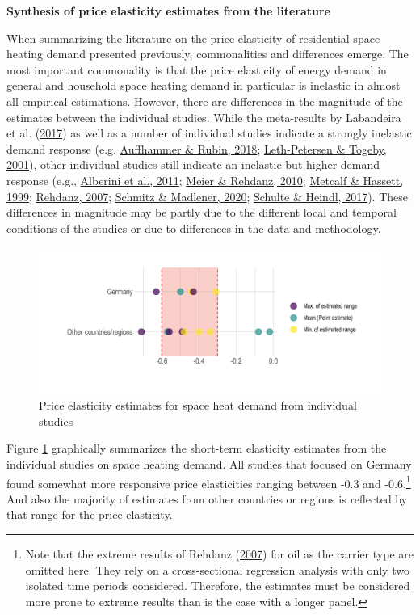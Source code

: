 \documentclass[12pt,twoside]{reedthesis}
\begin{document}
\textbf{Synthesis of price elasticity estimates from the literature}

When summarizing the literature on the price elasticity of residential space heating demand presented previously, commonalities and differences emerge. The most important commonality is that the price elasticity of energy demand in general and household space heating demand in particular is inelastic in almost all empirical estimations. However, there are differences in the magnitude of the estimates between the individual studies. While the meta-results by Labandeira et al. (\protect\hyperlink{ref-labandeira_etal17}{2017}) as well as a number of individual studies indicate a strongly inelastic demand response (e.g. \protect\hyperlink{ref-auffhammer_rubin18}{Auffhammer \& Rubin, 2018}; \protect\hyperlink{ref-leth-petersen_togeby01}{Leth-Petersen \& Togeby, 2001}), other individual studies still indicate an inelastic but higher demand response (e.g., \protect\hyperlink{ref-alberini_etal11}{Alberini et al., 2011}; \protect\hyperlink{ref-meier_rehdanz10}{Meier \& Rehdanz, 2010}; \protect\hyperlink{ref-metcalf_hassett99}{Metcalf \& Hassett, 1999}; \protect\hyperlink{ref-rehdanz07}{Rehdanz, 2007}; \protect\hyperlink{ref-schmitz_madlener20}{Schmitz \& Madlener, 2020}; \protect\hyperlink{ref-schulte_heindl17}{Schulte \& Heindl, 2017}). These differences in magnitude may be partly due to the different local and temporal conditions of the studies or due to differences in the data and methodology.
\begin{figure}

{\centering \includegraphics[width=1\linewidth]{figure/plot_literature_estimates} 

}

\caption{Price elasticity estimates for space heat demand from individual studies}\label{fig:literature-estimates-plot}
\end{figure}
Figure \ref{fig:literature-estimates-plot} graphically summarizes the short-term elasticity estimates from the individual studies on space heating demand. All studies that focused on Germany found somewhat more responsive price elasticities ranging between -0.3 and -0.6.\footnote{Note that the extreme results of Rehdanz (\protect\hyperlink{ref-rehdanz07}{2007}) for oil as the carrier type are omitted here. They rely on a cross-sectional regression analysis with only two isolated time periods considered. Therefore, the estimates must be considered more prone to extreme results than is the case with a longer panel.} And also the majority of estimates from other countries or regions is reflected by that range for the price elasticity.
\end{document}
